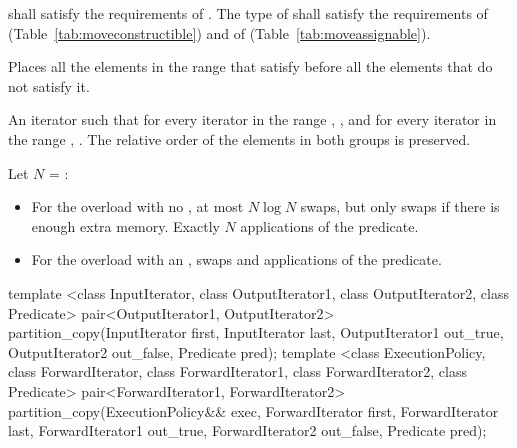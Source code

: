 \begin{itemdescr}
\pnum
\requires
{} shall satisfy the requirements of
. The type
of  shall satisfy the requirements of
 (Table~\ref{tab:moveconstructible}) and of
 (Table~\ref{tab:moveassignable}).

\pnum
\effects
Places all the elements in the range
that satisfy  before all the
elements that do not satisfy it.

\pnum
\returns
An iterator
such that for every iterator
in the range
,
,
and for every iterator
in the range
,
.
The relative order of the elements in both groups is preserved.

\pnum
\complexity
Let $N$ = :
\begin{itemize}
\item For the overload with no , at most $N \log N$ swaps,
but only  swaps if there is enough extra memory.  Exactly $N$
applications of the predicate.
\item For the overload with an ,
 swaps and  applications of the predicate.
\end{itemize}

\end{itemdescr}

%
\begin{itemdecl}
template <class InputIterator, class OutputIterator1,
          class OutputIterator2, class Predicate>
  pair<OutputIterator1, OutputIterator2>
    partition_copy(InputIterator first, InputIterator last,
                   OutputIterator1 out_true, OutputIterator2 out_false,
                   Predicate pred);
template <class ExecutionPolicy, class ForwardIterator, class ForwardIterator1,
          class ForwardIterator2, class Predicate>
  pair<ForwardIterator1, ForwardIterator2>
    partition_copy(ExecutionPolicy&& exec,
                   ForwardIterator first, ForwardIterator last,
                   ForwardIterator1 out_true, ForwardIterator2 out_false,
                   Predicate pred);
\end{itemdecl}


